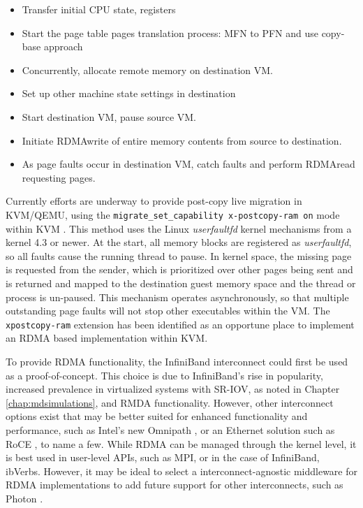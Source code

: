 \begin{itemize}
\item Transfer initial CPU state, registers
\item Start the page table pages translation process: MFN to PFN and use copy-base approach
\item Concurrently, allocate remote memory on destination VM.
\item Set up other machine state settings in destination
\item Start destination VM, pause source VM.
\item Initiate RDMAwrite of entire memory contents from source to destination.
\item As page faults occur in destination VM, catch faults and perform RDMAread requesting pages. 
\end{itemize}

Currently efforts are underway to provide post-copy live migration in KVM/QEMU, using the \verb!migrate_set_capability x-postcopy-ram on! mode within KVM \cite{www-kvm-postcopy}. This method uses the Linux \emph{userfaultfd} kernel mechanisms from a kernel 4.3 or newer. At the start, all memory blocks are registered as \emph{userfaultfd}, so all faults cause the running thread to pause. In kernel space, the missing page is requested from the sender, which is prioritized over other pages being sent and is returned and mapped to the destination guest memory space and the thread or process is un-paused. This mechanism operates asynchronously, so that multiple outstanding page faults will not stop other executables within the VM. The \verb!xpostcopy-ram! extension has been identified as an opportune place to implement an RDMA based implementation within KVM. 

To provide RDMA functionality, the InfiniBand interconnect could first be used as a proof-of-concept. This choice is due to InfiniBand's rise in popularity, increased prevalence in virtualized systems with SR-IOV, as noted in Chapter \ref{chap:mdsimulations}, and RMDA functionality. However, other interconnect options exist that may be better suited for enhanced functionality and performance, such as Intel's new Omnipath \cite{omnipath2015}, or an Ethernet solution such as RoCE \cite{beck2011roce}, to name a few.  While RDMA can be managed through the kernel level, it is best used in user-level APIs, such as MPI, or in the case of InfiniBand, ibVerbs. However, it may be ideal to select a interconnect-agnostic middleware for RDMA implementations to add future support for other interconnects, such as Photon \cite{kissel2016photon}.



